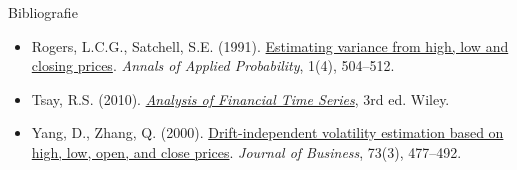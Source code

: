 \begin{frame}{Bibliografie}
\begin{itemize}
    \item Rogers, L.C.G., Satchell, S.E. (1991). \href{https://doi.org/10.1214/aoap/1177005835}{Estimating variance from high, low and closing prices}. \textit{Annals of Applied Probability}, 1(4), 504--512.
    \item Tsay, R.S. (2010). \href{https://doi.org/10.1002/9780470644560}{\textit{Analysis of Financial Time Series}}, 3rd ed. Wiley.
    \item Yang, D., Zhang, Q. (2000). \href{https://doi.org/10.1086/209650}{Drift-independent volatility estimation based on high, low, open, and close prices}. \textit{Journal of Business}, 73(3), 477--492.
\end{itemize}
\end{frame}


